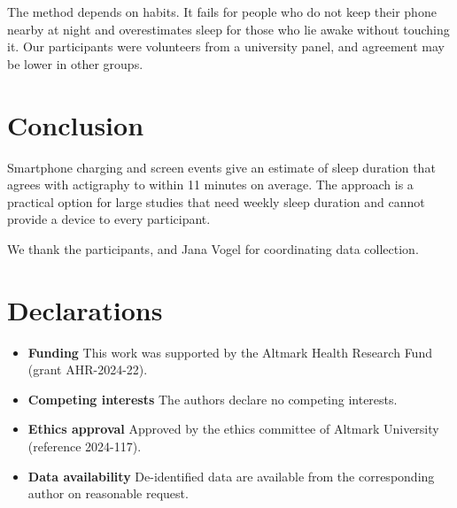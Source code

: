 \documentclass[pdflatex,sn-mathphys-num]{sn-jnl}
\begin{document}
The method depends on habits. It fails for people who do not keep their phone nearby at night and overestimates sleep for those who lie awake without touching it. Our participants were volunteers from a university panel, and agreement may be lower in other groups.

\section{Conclusion}\label{sec:conclusion}
Smartphone charging and screen events give an estimate of sleep duration that agrees with actigraphy to within 11 minutes on average. The approach is a practical option for large studies that need weekly sleep duration and cannot provide a device to every participant.

\backmatter

We thank the participants, and Jana Vogel for coordinating data collection.

\section*{Declarations}
\begin{itemize}
\item \textbf{Funding} This work was supported by the Altmark Health Research Fund (grant AHR-2024-22).
\item \textbf{Competing interests} The authors declare no competing interests.
\item \textbf{Ethics approval} Approved by the ethics committee of Altmark University (reference 2024-117).
\item \textbf{Data availability} De-identified data are available from the corresponding author on reasonable request.
\end{itemize}


\end{document}
